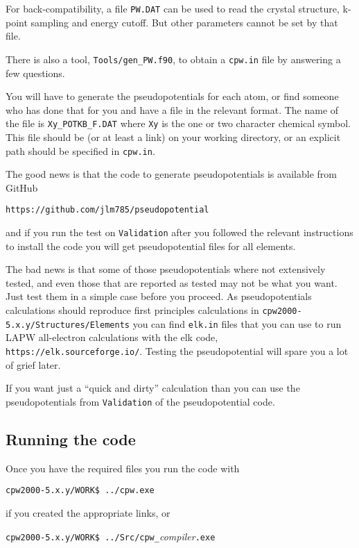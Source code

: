 \documentclass[11pt]{article}
\begin{document}
For back-compatibility, a file \texttt{PW.DAT} can be used to read the crystal structure,
k-point sampling and energy cutoff.  But other parameters cannot be set by that file.

There is also a tool, \texttt{Tools/gen{\_}PW.f90},  to obtain a \texttt{cpw.in} file by answering a few questions.


You will have to generate the pseudopotentials for each atom, or find someone who has done that
for you and have a file in the relevant format.  The name of the file is \texttt{Xy{\_}POTKB{\_}F.DAT} where
\texttt{Xy} is the one or two character chemical symbol.  This file should be (or at least a link) on
your working directory, or an explicit path should be specified in \texttt{cpw.in}.

The good news is that the code to generate pseudopotentials is available from GitHub

\noindent\texttt{https://github.com/jlm785/pseudopotential}

and if you run the test on \texttt{Validation} after you followed the relevant instructions
to install the code you will get pseudopotential files for all elements.

The bad news is that some of those pseudopotentials where not extensively tested, and even those
that are reported as tested may not be what you want.  Just test them in a simple case
before you proceed.  As pseudopotentials calculations should reproduce first principles
calculations in \texttt{cpw2000-5.x.y/Structures/Elements} you can find
\texttt{elk.in} files that you can use to run LAPW all-electron calculations with the {\sc elk} code,
\texttt{https://elk.sourceforge.io/}.  Testing the pseudopotential will spare you a lot of grief
later.

If you want just a ``quick and dirty'' calculation than you can use the pseudopotentials
from \texttt{Validation} of the pseudopotential code.


\subsection{Running the code}
\label{sec:run-code}

Once you have the required files you run the code with

\noindent\texttt{cpw2000-5.x.y/WORK\$ ../cpw.exe}

if you created the appropriate links, or

\noindent\texttt{cpw2000-5.x.y/WORK\$ ../Src/cpw{\_}}\textit{compiler}\texttt{.exe}
\end{document}
